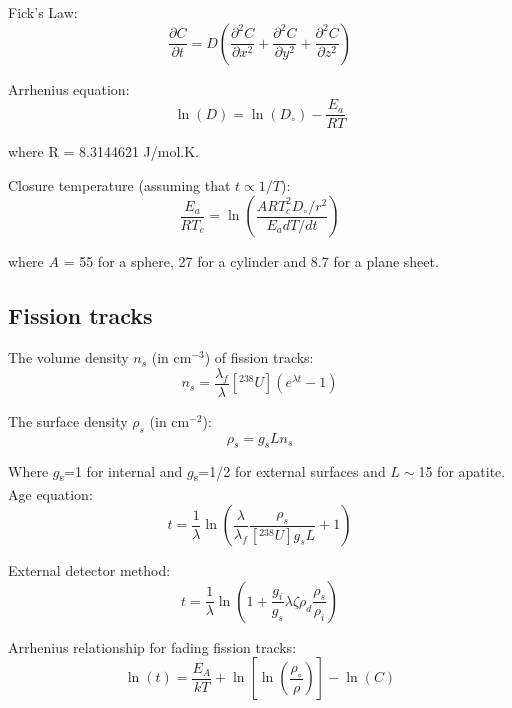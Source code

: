 \documentclass{article}
\begin{document}
\begin{multicols}{3}
Fick's Law:
\begin{equation}
\frac{\partial C}{\partial t} = D \left(
\frac{\partial^2C}{\partial x^2} + \frac{\partial^2C}{\partial y^2} +
\frac{\partial^2C}{\partial z^2}\right)
\label{eq:fick}
\end{equation}

Arrhenius equation:
\begin{equation}
\ln(D) = \ln(D_\circ) - \frac{E_a}{RT}
\label{eq:logD}
\end{equation}

where R = 8.3144621 J/mol.K.\medskip

Closure temperature (assuming that $t \propto 1/T$):
\begin{equation}
\frac{E_a}{RT_c} = \ln\left(\frac{ART_c^2D_\circ/r^2}{E_adT/dt}\right)
\label{eq:Tc}
\end{equation}

where $A$ = 55 for a sphere, 27 for a cylinder and 8.7 for a plane
sheet.

\subsection{Fission tracks}
\label{sec:fission-tracks}

The volume density $n_s$ (in cm$^{-3}$) of fission tracks:
\begin{equation}
n_{s} = \frac{\lambda_f}{\lambda} [^{238}U] \left(e^{\lambda t}-1\right)
\label{eq:Ns}
\end{equation}

The surface density $\rho_s$ (in cm$^{-2}$):
\begin{equation}
\rho_s = g_s L n_s
\label{eq:rhos}
\end{equation}

Where $g$\textsubscript{s}=1 for internal and $g$\textsubscript{s}=1/2
for external surfaces and $L\sim$15 for apatite. Age
equation:
\begin{equation}
t = \frac{1}{\lambda}
\ln\left(\frac{\lambda}{\lambda_f}\frac{\rho_s}{[^{238}U] g_s L
}+1\right)
\label{eq:tFT}
\end{equation}

External detector method:
\begin{equation}
t =
\frac{1}{\lambda}\ln\left(1+\frac{g_i}{g_s}\lambda\zeta\rho_d\frac{\rho_s}{\rho_i}\right)
\label{eq:tzeta}
\end{equation}

Arrhenius relationship for fading fission tracks:
\begin{equation}
\ln(t) = \frac{E_A}{kT} +
\ln\left[\ln\left(\frac{\rho_\circ}{\rho}\right)\right] - \ln(C)
\label{eq:lnt}
\end{equation}


\end{multicols}
\end{document}
